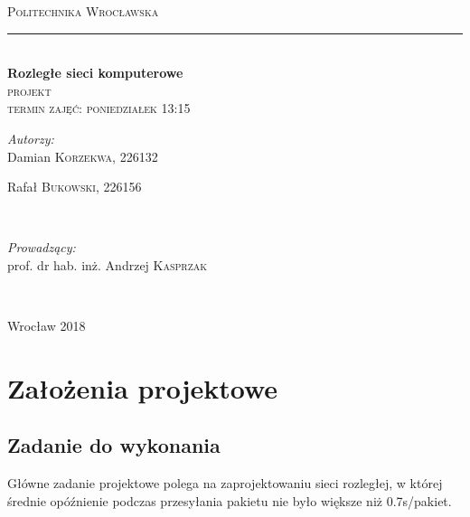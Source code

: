 \documentclass[a4paper]{article}
\begin{document}
\begin{titlepage}

\newcommand{\HRule}{\rule{\linewidth}{0.5mm}}

\center

\textsc{\large Politechnika Wrocławska}\\[4cm] 

\HRule \\[0.6cm]
{\huge \bfseries Rozległe sieci komputerowe}\\[0.4cm] 
\textsc{\Large projekt}\\[0.4cm]

{\textsc{\large termin zajęć: poniedziałek 13:15}}\\[1.0cm]

\begin{minipage}{0.4\textwidth}
	\begin{flushleft} \large
		\emph{Autorzy:}\\[0.1cm]
		Damian \textsc{Korzekwa}, 226132
        
        Rafał \textsc{Bukowski}, 226156
	\end{flushleft}
\end{minipage}
~
\begin{minipage}{0.5\textwidth}
	\begin{flushright} \large
		\emph{Prowadzący:} \\[0.1cm]
		prof. dr hab. inż. Andrzej \textsc{Kasprzak}
	\end{flushright}
\end{minipage}\\[1cm]

\vfill

{\large Wrocław 2018}

\end{titlepage}

\tableofcontents
\newpage

\section{Założenia projektowe}

\subsection{Zadanie do wykonania}

Główne zadanie projektowe polega na zaprojektowaniu sieci rozległej, w której średnie opóźnienie podczas przesyłania pakietu nie było większe niż 0.7s/pakiet.
\end{document}
